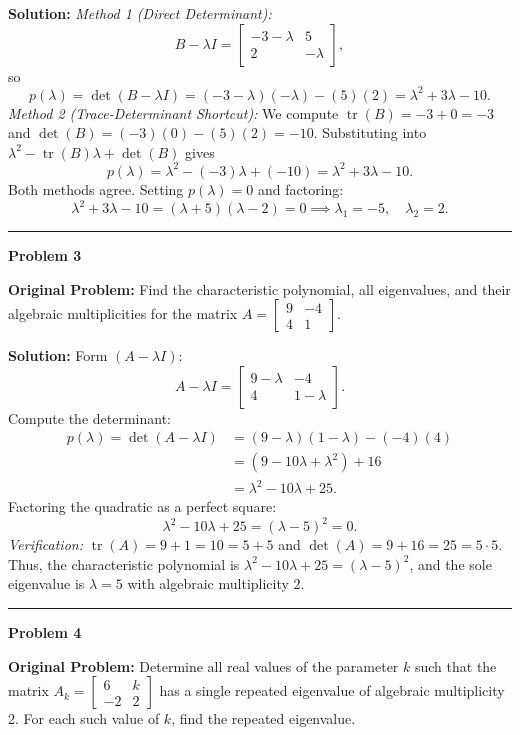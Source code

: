 \documentclass[11pt, letterpaper]{article}
\theoremstyle{definition}
\theoremstyle{remark}
\begin{document}
\textbf{Solution:}
\textit{Method 1 (Direct Determinant):}
\[
B - \lambda I = \begin{bmatrix} -3 - \lambda & 5 \\ 2 & -\lambda \end{bmatrix},
\]
so
\[
p(\lambda) = \det(B - \lambda I) = (-3 - \lambda)(-\lambda) - (5)(2) = \lambda^2 + 3\lambda - 10.
\]
\textit{Method 2 (Trace-Determinant Shortcut):}
We compute $\operatorname{tr}(B) = -3 + 0 = -3$ and $\det(B) = (-3)(0) - (5)(2) = -10$. Substituting into $\lambda^2 - \operatorname{tr}(B)\lambda + \det(B)$ gives
\[
p(\lambda) = \lambda^2 - (-3)\lambda + (-10) = \lambda^2 + 3\lambda - 10.
\]
Both methods agree. Setting $p(\lambda) = 0$ and factoring:
\[
\lambda^2 + 3\lambda - 10 = (\lambda + 5)(\lambda - 2) = 0 \implies \lambda_1 = -5, \quad \lambda_2 = 2.
\]

\noindent\rule{\textwidth}{0.4pt}

\noindent\textbf{Problem 3}

\textbf{Original Problem:} Find the characteristic polynomial, all eigenvalues, and their algebraic multiplicities for the matrix $A = \begin{bmatrix} 9 & -4 \\ 4 & 1 \end{bmatrix}$.

\textbf{Solution:} Form $(A - \lambda I)$:
\[
A - \lambda I = \begin{bmatrix} 9 - \lambda & -4 \\ 4 & 1 - \lambda \end{bmatrix}.
\]
Compute the determinant:
\begin{align*}
p(\lambda) = \det(A - \lambda I) &= (9 - \lambda)(1 - \lambda) - (-4)(4) \\
&= (9 - 10\lambda + \lambda^2) + 16 \\
&= \lambda^2 - 10\lambda + 25.
\end{align*}
Factoring the quadratic as a perfect square:
\[
\lambda^2 - 10\lambda + 25 = (\lambda - 5)^2 = 0.
\]
\textit{Verification:} $\operatorname{tr}(A) = 9 + 1 = 10 = 5 + 5$ and $\det(A) = 9 + 16 = 25 = 5 \cdot 5$.
Thus, the characteristic polynomial is $\lambda^2 - 10\lambda + 25 = (\lambda - 5)^2$, and the sole eigenvalue is $\lambda = 5$ with algebraic multiplicity $2$.

\noindent\rule{\textwidth}{0.4pt}

\noindent\textbf{Problem 4}

\textbf{Original Problem:} Determine all real values of the parameter $k$ such that the matrix $A_k = \begin{bmatrix} 6 & k \\ -2 & 2 \end{bmatrix}$ has a single repeated eigenvalue of algebraic multiplicity $2$. For each such value of $k$, find the repeated eigenvalue.
\end{document}
